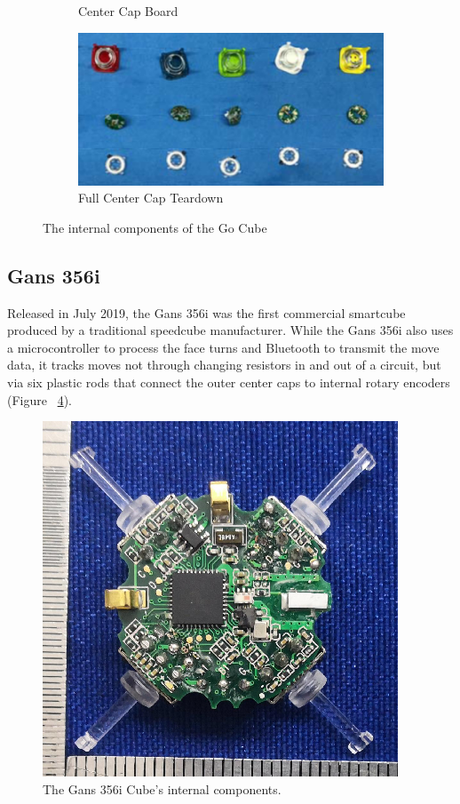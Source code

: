 \begin{figure}
\begin{subfigure}{0.25\textwidth}
        \caption{Center Cap Board}
        \label{fig:gocube-cap-chip}
    \end{subfigure}%
    \begin{subfigure}{0.50\textwidth}
        \centering
        \includegraphics[width=.90\linewidth]{Figures/3 State of the Art/gocube-centers.png}
        \caption{Full Center Cap Teardown}
        \label{fig:gocube-centers}
    \end{subfigure}%
    \caption{The internal components of the Go Cube \cite{gocube-internals}}
    \label{fig:gocube-internal-components}
\end{figure}

\subsection{Gans 356i}
Released in July 2019, the Gans 356i was the first commercial smartcube produced by a traditional speedcube manufacturer. \cite{gans356i-thecubicle}
While the Gans 356i also uses a microcontroller to process the face turns and Bluetooth to transmit the move data, it tracks moves not through changing resistors in and out of a circuit, but via six plastic rods that connect the outer center caps to internal rotary encoders (Figure ~\ref{fig:gans356i-core}).

\begin{figure}
    \centering
    \includegraphics{Figures/3 State of the Art/gans356i-core.png}
    \decoRule
    \caption[Gans 356i Teardown]{The Gans 356i Cube's internal components. \cite{gans-356i-internals}}
    \label{fig:gans356i-core}
\end{figure}


